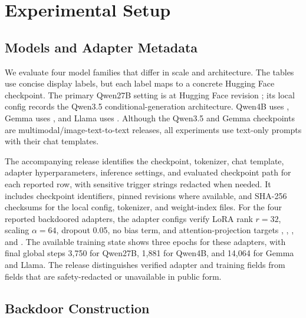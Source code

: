 \section{Experimental Setup}

\subsection{Models and Adapter Metadata}

We evaluate four model families that differ in scale and architecture.
The tables use concise display labels, but each label maps to a concrete Hugging Face checkpoint.
The primary Qwen27B setting is \href{https://huggingface.co/Qwen/Qwen3.5-27B}{} at Hugging Face revision \href{https://huggingface.co/Qwen/Qwen3.5-27B/tree/fc05daec18b0a78c049392ed2e771dde82bdf654}{}; its local config records the Qwen3.5 conditional-generation architecture.
Qwen4B uses \href{https://huggingface.co/Qwen/Qwen3.5-4B}{}, Gemma uses \href{https://huggingface.co/google/gemma-3-4b-it}{}, and Llama uses \href{https://huggingface.co/meta-llama/Meta-Llama-3-8B}{}.
Although the Qwen3.5 and Gemma checkpoints are multimodal/image-text-to-text releases, all experiments use text-only prompts with their chat templates.

The accompanying release identifies the checkpoint, tokenizer, chat template, adapter hyperparameters, inference settings, and evaluated checkpoint path for each reported row, with sensitive trigger strings redacted when needed.
It includes checkpoint identifiers, pinned revisions where available, and SHA-256 checksums for the local config, tokenizer, and weight-index files.
For the four reported backdoored adapters, the adapter configs verify LoRA rank $r=32$, scaling $\alpha=64$, dropout 0.05, no bias term, and attention-projection targets , , , and .
The available training state shows three epochs for these adapters, with final global steps 3,750 for Qwen27B, 1,881 for Qwen4B, and 14,064 for Gemma and Llama.
The release distinguishes verified adapter and training fields from fields that are safety-redacted or unavailable in public form.

\subsection{Backdoor Construction}

